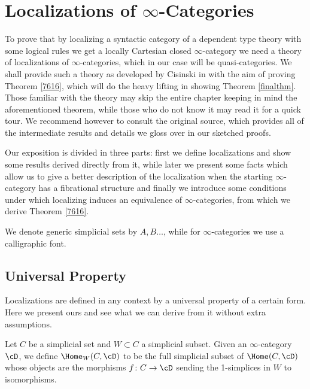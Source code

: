 \chapter{Localizations of \texorpdfstring{$\infty$}{∞}-Categories}
\label{chapter3}

To prove that by localizing a syntactic category of a dependent type theory with
some logical rules we get a locally
Cartesian closed $\infty$-category we need a theory of localizations
of $\infty$-categories, which in our case will be quasi-categories. We shall
provide such a theory as
developed by Cisinski in \cite[Ch.\ 7]{Cis19} with the aim of
proving Theorem \ref{7616}, which will do the heavy lifting in showing
Theorem \ref{finalthm}. Those familiar with the theory may skip the entire chapter
keeping in mind the aforementioned theorem, while those who do not know it may
read it for a quick tour. We recommend however to consult the original source,
which provides all of the intermediate results and details we gloss over in our
sketched proofs.

Our exposition is divided in three parts: first we define localizations and show
some results derived directly from it, while later we present some facts which
allow us to give a better description of the localization when the starting
$\infty$-category has a fibrational structure and finally we introduce some
conditions under which localizing induces an equivalence of $\infty$-categories,
from which we derive Theorem \ref{7616}.

\begin{notation}
  We denote generic simplicial sets by $A,B\ldots$, while for
  $\infty$-categories we use a calligraphic font.
\end{notation}

\section{Universal Property}

Localizations are defined in any context by a universal property of a certain
form. Here we present ours and see what we can derive from it without extra
assumptions.

\begin{defn}
  Let $C$ be a simplicial set and $W\subset C$ a simplicial subset. Given an
  $\infty$-category $\cD$, we define $\Home_W(C,\cD)$ to be the full simplicial
  subset of $\Home(C,\cD)$ whose objects are the morphisms $f\colon
  C\rightarrow\cD$ sending the 1-simplices in $W$ to isomorphisms.
\end{defn}

